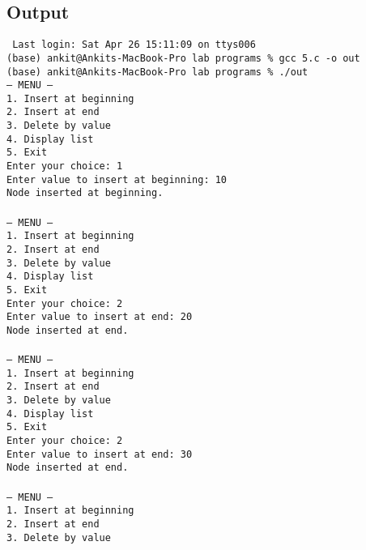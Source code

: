 \documentclass[12pt,a4paper]{article}
\begin{document}
\subsection*{Output}
\begin{tcolorbox}[terminalstyle, title=Sample Output]
\texttt{
Last login: Sat Apr 26 15:11:09 on ttys006\\
(base) ankit@Ankits-MacBook-Pro lab programs \% gcc 5.c -o out\\
(base) ankit@Ankits-MacBook-Pro lab programs \% ./out\\
--- MENU ---\\
1. Insert at beginning\\
2. Insert at end\\
3. Delete by value\\
4. Display list\\
5. Exit\\
Enter your choice: 1\\
Enter value to insert at beginning: 10\\
Node inserted at beginning.\\
\\
--- MENU ---\\
1. Insert at beginning\\
2. Insert at end\\
3. Delete by value\\
4. Display list\\
5. Exit\\
Enter your choice: 2\\
Enter value to insert at end: 20\\
Node inserted at end.\\
\\
--- MENU ---\\
1. Insert at beginning\\
2. Insert at end\\
3. Delete by value\\
4. Display list\\
5. Exit\\
Enter your choice: 2\\
Enter value to insert at end: 30\\
Node inserted at end.\\
\\
--- MENU ---\\
1. Insert at beginning\\
2. Insert at end\\
3. Delete by value\\
}
\end{tcolorbox}
\end{document}
